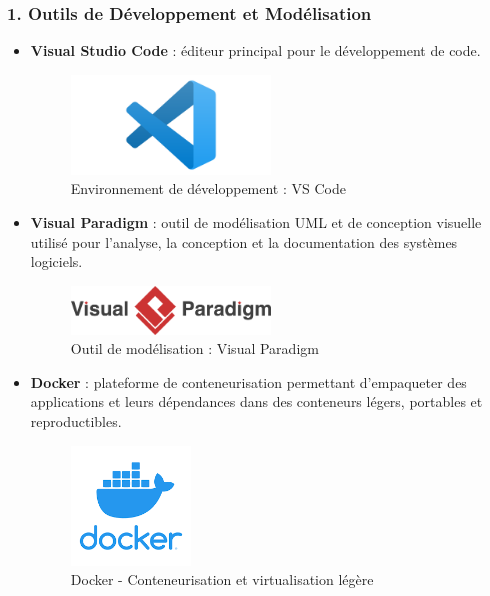 \renewcommand{\thesubsubsection}{\thesubsection.\arabic{subsubsection}} %

\subsubsection{1. Outils de Développement et Modélisation}

\begin{itemize}
    \item \textbf{Visual Studio Code} : éditeur principal pour le développement de code.
    \begin{figure}[H]
        \centering
        \includegraphics[width=0.5\textwidth]{logos/vscode.png}
        \caption{Environnement de développement : VS Code}
    \end{figure}

    \item \textbf{Visual Paradigm} : outil de modélisation UML et de conception visuelle utilisé pour l’analyse, la conception et la documentation des systèmes logiciels.
    \begin{figure}[H]
        \centering
        \includegraphics[width=0.5\textwidth]{logos/visualparadigm.png}
        \caption{Outil de modélisation : Visual Paradigm}
    \end{figure}

    \item \textbf{Docker} : plateforme de conteneurisation permettant d’empaqueter des applications et leurs dépendances dans des conteneurs légers, portables et reproductibles.
    \begin{figure}[H]
        \centering
        \includegraphics[width=0.3\textwidth]{logos/docker.png}
        \caption{Docker - Conteneurisation et virtualisation légère}
    \end{figure}


\end{itemize}
